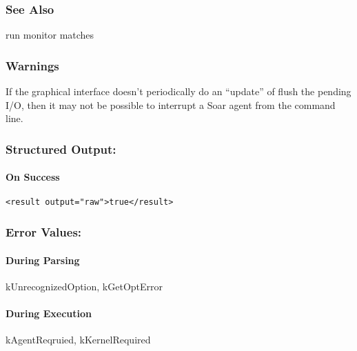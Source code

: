 \subsubsection*{See Also}
 run monitor matches
\subsubsection*{Warnings}
 If the graphical interface doesn't periodically do an ``update'' of flush the pending I/O, then it may not be possible to interrupt a Soar agent from the command line. 
\subsubsection*{Structured Output:}
\paragraph*{On Success}
\begin{verbatim}
<result output="raw">true</result>
\end{verbatim}
\subsubsection*{Error Values:}
\paragraph*{During Parsing}
 kUnrecognizedOption, kGetOptError
\paragraph*{During Execution}
 kAgentReqruied, kKernelRequired
